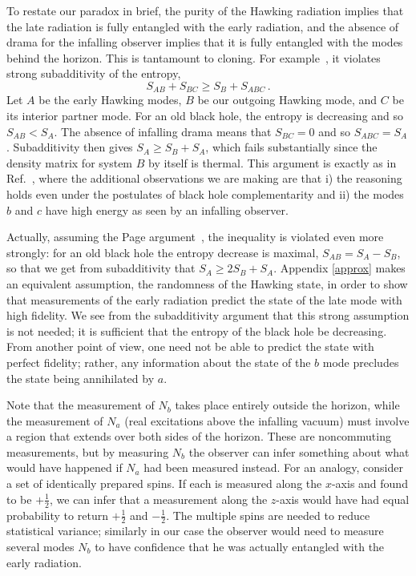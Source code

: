 \documentclass[12pt]{article}
\begin{document}
To restate our paradox in brief, the purity of the Hawking radiation implies that the late radiation is fully entangled with the early radiation, and the absence of drama for the infalling observer implies that it is fully entangled with the modes behind the horizon.  This is tantamount to cloning.  For example~\cite{Mathur:2009hf}, it violates strong subadditivity of the entropy,
\begin{equation}
S_{AB} + S_{BC} \geq S_B + S_{ABC}\,.
\end{equation}
Let $A$ be the early Hawking modes, $B$ be our outgoing Hawking mode, and $C$ be its interior partner mode.  For an old black hole, the entropy is decreasing and so $S_{AB} < S_A$.  The absence of infalling drama means that $S_{BC}=0$ and so $S_{ABC} = S_A$.
{Subadditivity then} gives $S_A \geq S_B + S_A$, which fails substantially since the density matrix for system $B$ by itself is
thermal.  {This argument is exactly as in Ref.~\cite{Mathur:2009hf}, where the additional observations we are making are that i) the reasoning holds even under the postulates of black hole complementarity and ii) the modes $b$ and $c$ have high energy as seen by an infalling observer.}


Actually, assuming the Page argument~\cite{Page:1993df}, the inequality is violated even more strongly: for an old black hole the entropy decrease is maximal, $S_{AB} = S_A - S_B$, so that we get from subadditivity that $S_A \geq 2S_B + S_A$.  Appendix \ref{approx} makes an equivalent assumption, the randomness of the Hawking state, in order to show that  measurements of the early radiation
predict the state of the late mode with high fidelity.  We see from the subadditivity argument that this strong assumption is not
needed; it is sufficient that the entropy of the black hole be decreasing.  From another point of view,
one need not be able to predict the state with perfect fidelity; rather, any information about the state of the $b$ mode precludes the state being annihilated by $a$.

Note that the measurement of $N_b$ takes place entirely outside the horizon, while the measurement of $N_a$ (real excitations above the infalling vacuum) must involve a region that extends over both sides of the horizon.  These are noncommuting measurements, but by measuring $N_b$ the observer can infer something about what would have happened if $N_a$ had been measured {instead}.  For an analogy, consider a set of identically prepared spins.  If each is measured along the $x$-axis and found to be $+\frac12$, we can infer that a measurement along the $z$-axis would have had equal probability to return $+\frac12$ and $-\frac12$.  The multiple spins are needed to reduce statistical variance; similarly in our case the observer would need to measure several modes $N_b$ to have confidence that he was actually entangled with the early radiation.
\end{document}
